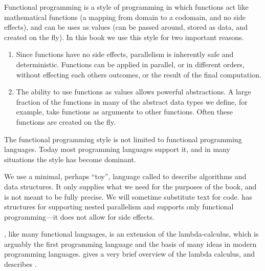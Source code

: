 \begin{gram}
  Functional programming is a style of programming in which functions
  act like mathematical functions (a mapping from domain to a
  codomain, and no side effects), and can be uses as values (can be
  passed around, stored as data, and created on the fly).  In this
  book we use this style for two important reasons.

\begin{enumerate}
\item Since functions have no side effects, parallelism is inherently
  safe and deterministic. Functions can be applied in parallel, or in
  different orders, without effecting each others outcomes, or the
  result of the final computation.
\item The ability to use functions as values allows powerful
  abstractions.  A large fraction of the functions in many of the
  abstract data types we define, for example, take functions as
  arguments to other functions. Often these functions are created on
  the fly.
\end{enumerate}

The functional programming style is not limited to functional
programming languages.  Today most programming languages support it,
and in many situations the style has become dominant.  
\end{gram}

\begin{gram}[\pml{}]
We use a minimal, perhaps ``toy'',  language called \pml{} to describe algorithms
and data structures.   It only supplies what we need for the purposes of the book,
and is not meant to be fully precise.   We will sometime substitute text for code.  \pml{} has structures for supporting nested
parallelism and supports only functional programming---it does not allow for
side effects.

\pml{}, like many functional languages, is an extension of the
lambda-calculus, which is arguably the first programming language
and the basis of many ideas in modern programming languages.
 gives a very brief overview of the lambda
calculus, and  describes \pml{}.
\end{gram}

